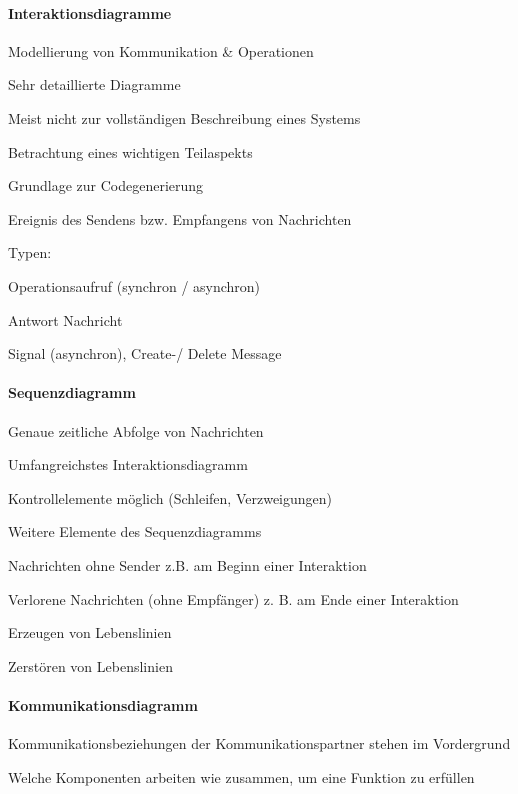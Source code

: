 \documentclass[a4paper]{article}
\begin{document}
\begin{multicols}{3}
  \paragraph{Interaktionsdiagramme}
  \begin{itemize*}
    \item Modellierung von Kommunikation \& Operationen
    \item Sehr detaillierte Diagramme
    \item Meist nicht zur vollständigen Beschreibung eines Systems
    \item Betrachtung eines wichtigen Teilaspekts
    \item Grundlage zur Codegenerierung
    \item Ereignis des Sendens bzw. Empfangens von Nachrichten
    \item Typen:
    \begin{itemize*}
      \item Operationsaufruf (synchron / asynchron)
      \item Antwort Nachricht
      \item Signal (asynchron), Create-/ Delete Message
    \end{itemize*}
  \end{itemize*}

  \paragraph{Sequenzdiagramm}
  \begin{itemize*}
    \item Genaue zeitliche Abfolge von Nachrichten
    \item Umfangreichstes Interaktionsdiagramm
    \item Kontrollelemente möglich (Schleifen, Verzweigungen)
    \item Weitere Elemente des Sequenzdiagramms
    \begin{itemize*}
      \item Nachrichten ohne Sender z.B. am Beginn einer Interaktion
      \item Verlorene Nachrichten (ohne Empfänger) z. B. am Ende einer Interaktion
      \item Erzeugen von Lebenslinien
      \item Zerstören von Lebenslinien
    \end{itemize*}
  \end{itemize*}

  \paragraph{Kommunikationsdiagramm}
  \begin{itemize*}
    \item Kommunikationsbeziehungen der Kommunikationspartner stehen im Vordergrund
    \item Welche Komponenten arbeiten wie zusammen, um eine Funktion zu erfüllen
  \end{itemize*}


\end{multicols}
\end{document}
